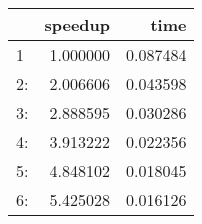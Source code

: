 \begin{tabular}{lrr}
\toprule
{} &   speedup &      time \\
\midrule
1  &  1.000000 &  0.087484 \\
2: &  2.006606 &  0.043598 \\
3: &  2.888595 &  0.030286 \\
4: &  3.913222 &  0.022356 \\
5: &  4.848102 &  0.018045 \\
6: &  5.425028 &  0.016126 \\
\bottomrule
\end{tabular}
